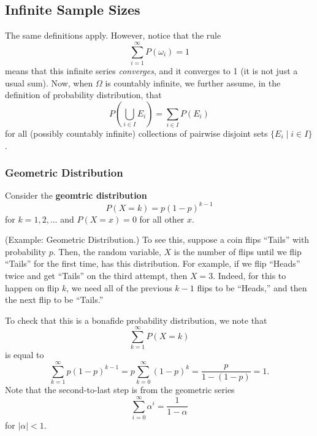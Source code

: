 \documentclass[letterpaper]{article}
\begin{document}
\subsection{Infinite Sample Sizes}
The same definitions apply. However, notice that the rule 
\[\sum_{i = 1}^{\infty} P(\omega_i) = 1\]
means that this infinite series \emph{converges}, and it converges to 1 (it is not just a usual sum). Now, when $\Omega$ is countably infinite, we further assume, in the definition of probability distribution, that 
\[P\left(\bigcup_{i \in I} E_i\right) = \sum_{i \in I} P(E_i)\]
for all (possibly countably infinite) collections of pairwise disjoint sets $\{E_i \mid i \in I\}$. 


\subsubsection{Geometric Distribution}
Consider the \textbf{geomtric distribution}
    \[P(X = k) = p(1 - p)^{k - 1}\]
for $k = 1, 2, \dots$ and $P(X = x) = 0$ for all other $x$. 
\begin{mdframed}[]
    (Example: Geometric Distribution.) To see this, suppose a coin flips ``Tails'' with probability $p$. Then, the random variable, $X$ is the number of flips until we flip ``Tails'' for the first time, has this distribution. For example, if we flip ``Heads'' twice and get ``Tails'' on the third attempt, then $X = 3$. Indeed, for this to happen on flip $k$, we need all of the previous $k - 1$ flips to be ``Heads,'' and then the next flip to be ``Tails.''
\end{mdframed}

To check that this is a bonafide probability distribution, we note that 
\[\sum_{k = 1}^{\infty} P(X = k)\]
is equal to 
\[\sum_{k = 1}^{\infty} p(1 - p)^{k - 1} = p\sum_{k = 0}^{\infty} (1 - p)^k = \frac{p}{1 - (1 - p)} = 1.\]
Note that the second-to-last step is from the geometric series 
\[\sum_{i = 0}^{\infty} \alpha^i = \frac{1}{1 - \alpha}\]
for $|\alpha| < 1$. 
\end{document}
